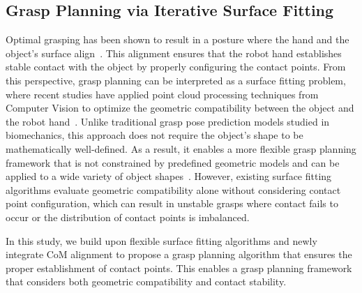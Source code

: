     \subsection{Grasp Planning via Iterative Surface Fitting}
        Optimal grasping has been shown to result in a posture where the hand and the object's surface align~\cite{biomechanics_JoB_2005,taxonomy_TRO_1989,taxonomy_THMS_2016}.
        This alignment ensures that the robot hand establishes stable contact with the object by properly configuring the contact points.
        From this perspective, grasp planning can be interpreted as a surface fitting problem, where recent studies have applied point cloud processing techniques from Computer Vision to optimize the geometric compatibility between the object and the robot hand~\cite{Fan_Case2018}. 
        Unlike traditional grasp pose prediction models studied in biomechanics, this approach does not require the object's shape to be mathematically well-defined.
        As a result, it enables a more flexible grasp planning framework that is not constrained by predefined geometric models and can be applied to a wide variety of object shapes~\cite{Fan_IROS_2018,Fan_IROS_2019,Fan_RAL_2019}.
        However, existing surface fitting algorithms evaluate geometric compatibility alone without considering contact point configuration, which can result in unstable grasps where contact fails to occur or the distribution of contact points is imbalanced.
        
        In this study, we build upon flexible surface fitting algorithms and newly integrate CoM alignment to propose a grasp planning algorithm that ensures the proper establishment of contact points.
        This enables a grasp planning framework that considers both geometric compatibility and contact stability.





